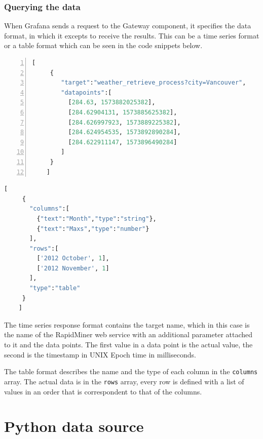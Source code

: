 \subsubsection{Querying the data}
When Grafana sends a request to the Gateway component, it specifies the data format, in which it excepts to receive the results. This can be a time series format or a table format which can be seen in the code snippets below.

\begin{minipage}[b]{0.45\linewidth}
	\centering
	\begin{lstlisting}[language=Python, frame=single, numbers=left, mathescape,%
	caption={Time series format}, label=lst:timeseries-format]
	[
	 {
	    "target":"weather_retrieve_process?city=Vancouver",
	    "datapoints":[
	      [284.63, 1573882025382],
	      [284.62904131, 1573885625382],
	      [284.626997923, 1573889225382],
	      [284.624954535, 1573892890284],
	      [284.622911147, 1573896490284]
	    ]
	 }
	]
	\end{lstlisting}
\end{minipage}
\hspace{0.5cm}
\begin{minipage}[b]{0.45\linewidth}
	\centering
	\begin{lstlisting}[language=Python, frame=single, mathescape,%
	caption={Table format}, label=lst:table-format]
	[
	 {
	   "columns":[
	     {"text":"Month","type":"string"},
	     {"text":"Maxs","type":"number"}
	   ],
	   "rows":[
	     ['2012 October', 1],
	     ['2012 November', 1]
	   ],
	   "type":"table"
	 }
	]
	\end{lstlisting}
\end{minipage}

The time series response format contains the target name, which in this case is the name of the RapidMiner web service with an additional parameter attached to it and the data points. The first value in a data point is the actual value, the second is the timestamp in UNIX Epoch time in milliseconds.

The table format describes the name and the type of each column in the \texttt{columns} array. The actual data is in the \texttt{rows} array, every row is defined with a list of values in an order that is correspondent to that of the columns.

\section{Python data source}


